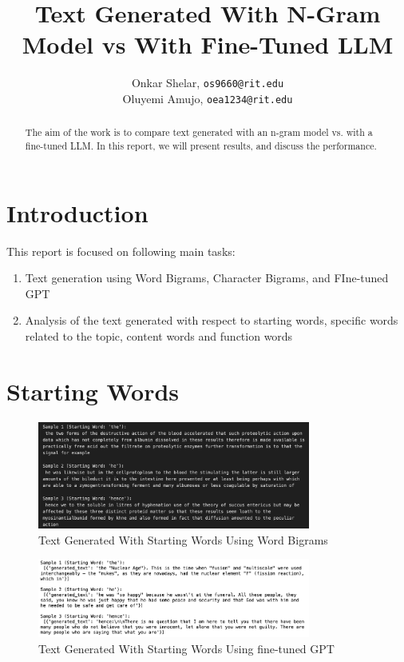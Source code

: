\documentclass[journal,onecolumn]{IEEEtran}
\title{Text Generated With N-Gram Model vs With Fine-Tuned LLM}
\author{
    Onkar Shelar, \texttt{os9660@rit.edu}\\
    Oluyemi Amujo, \texttt{oea1234@rit.edu}
}
\begin{document}
\maketitle

\begin{abstract}
The aim of the work is to compare text generated with an n-gram model vs. with a fine-tuned LLM. In this report, we will present results, and discuss the performance.
\end{abstract}

\section{Introduction}
This report is focused on following main tasks:
\begin{enumerate}
    \item Text generation using Word Bigrams, Character Bigrams, and FIne-tuned GPT 
    \item Analysis of the text generated with respect to starting words, specific words related to the topic, content words and function words
\end{enumerate}

\section{Starting Words}
\begin{figure}[H]
    \centering
    \includegraphics[width=0.8\textwidth]{WordBigrams/StartingWords_Bigram.png} %
    \caption{Text Generated With Starting Words Using Word Bigrams}
    \label{fig:example_result}
\end{figure}

\begin{figure}[H]
    \centering
    \includegraphics[width=0.8\textwidth]{GPT/StartingWords_GPT.png} %
    \caption{Text Generated With Starting Words Using fine-tuned GPT}
    \label{fig:example_result}
\end{figure}
\end{document}
